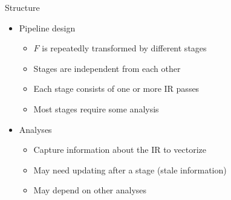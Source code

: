 
\begin{frame}{Structure}

\begin{itemize}
    \item Pipeline design
    \begin{itemize}
        \item $F$ is repeatedly transformed by different stages
        \item Stages are independent from each other
        \item Each stage consists of one or more IR passes
        \item Most stages require some analysis
    \end{itemize}
    \item Analyses
    \begin{itemize}
        \item Capture information about the IR to vectorize
        \item May need updating after a stage (stale information)
        \item May depend on other analyses
    \end{itemize}
\end{itemize}


\end{frame}


